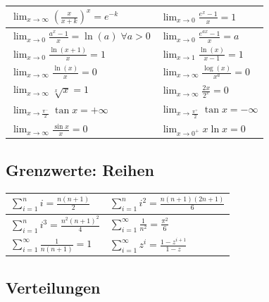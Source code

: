 \begin{center}
\begin{tabular}{  l || l  }
                 \hline
                $\lim_{x \to \infty} \left(\frac{x}{x + k}\right)^x = e^{-k}$ & $\lim_{x \to 0} \frac{e^x - 1}{x} = 1$ \\
                 \hline
                $\lim_{x \to 0} \frac{a^x - 1}{x} = \ln(a) \; \forall a > 0$ & $\lim_{x \to 0} \frac{e^{ax} - 1}{x} = a$ \\
                 \hline
                $\lim_{x \to 0} \frac{\ln(x + 1)}{x} = 1$ & $\lim_{x \to 1} \frac{\ln(x)}{x - 1} = 1$ \\
                 \hline
                $\lim_{x \to \infty} \frac{\ln(x)}{x} = 0$ & $\lim_{x \to \infty} \frac{\log(x)}{x^a} = 0$ \\
                 \hline
                $\lim_{x \to \infty} \sqrt[x]{x} = 1$ & $\lim_{x \to \infty} \frac{2x}{2^x} = 0$ \\
                 \hline 
                $\lim_{x \to \frac{\pi^-}{2}} \tan{x} = +\infty$ & $\lim_{x \to \frac{\pi^+}{2}} \tan{x} = -\infty$ \\
                \hline
                $\lim_{x \to \infty} \frac{\sin{x}}{x} = 0$ &  $\lim_{x \to 0^+} x\ln{x} = 0$\\
                \hline
	\end{tabular}
\end{center}
\subsection{Grenzwerte: Reihen}
\begin{center}
	\begin{tabular}{  l || l  }
	 	$\sum_{i = 1}^{n} i = \frac{n(n+1)}{2}$ & $\sum_{i=1}^{n} i^2 = \frac{n(n+1)(2n+1)}{6}$ \\
		 \hline 
	 	$\sum_{i=1}^{n} i^3 = \frac{n^2(n+1)^2}{4}$ & $\sum_{i = 1}^{\infty} \frac{1}{n^2} = \frac{\pi^2}{6}$ \\
		 \hline  
	 	$\sum_{i = 1}^{\infty} \frac{1}{n(n+1)} = 1$ & $\sum_{i = 1}^\infty z^i = \frac{1 - z^{i + 1}}{1 - z}$ \\
		 \hline   
	\end{tabular}
\end{center}

\newpage
\subsection{Verteilungen}

